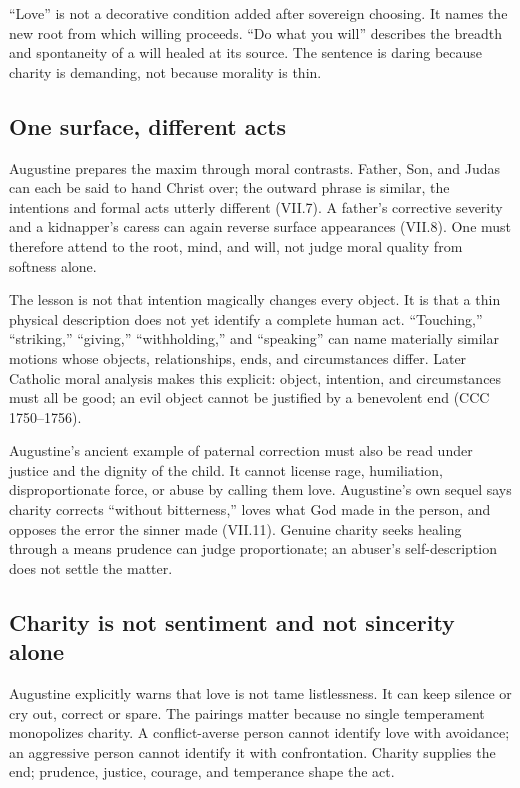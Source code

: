 ``Love'' is not a decorative condition added after sovereign choosing. It names the new root from which willing proceeds. ``Do what you will'' describes the breadth and spontaneity of a will healed at its source. The sentence is daring because charity is demanding, not because morality is thin.

\subsection{One surface, different acts}

Augustine prepares the maxim through moral contrasts. Father, Son, and Judas can each be said to hand Christ over; the outward phrase is similar, the intentions and formal acts utterly different (VII.7). A father's corrective severity and a kidnapper's caress can again reverse surface appearances (VII.8). One must therefore attend to the root, mind, and will, not judge moral quality from softness alone.

The lesson is not that intention magically changes every object. It is that a thin physical description does not yet identify a complete human act. ``Touching,'' ``striking,'' ``giving,'' ``withholding,'' and ``speaking'' can name materially similar motions whose objects, relationships, ends, and circumstances differ. Later Catholic moral analysis makes this explicit: object, intention, and circumstances must all be good; an evil object cannot be justified by a benevolent end (CCC 1750--1756).

Augustine's ancient example of paternal correction must also be read under justice and the dignity of the child. It cannot license rage, humiliation, disproportionate force, or abuse by calling them love. Augustine's own sequel says charity corrects ``without bitterness,'' loves what God made in the person, and opposes the error the sinner made (VII.11). Genuine charity seeks healing through a means prudence can judge proportionate; an abuser's self-description does not settle the matter.

\subsection{Charity is not sentiment and not sincerity alone}

Augustine explicitly warns that love is not tame listlessness. It can keep silence or cry out, correct or spare. The pairings matter because no single temperament monopolizes charity. A conflict-averse person cannot identify love with avoidance; an aggressive person cannot identify it with confrontation. Charity supplies the end; prudence, justice, courage, and temperance shape the act.

